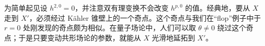 为简单起见设 $h^{2,0}=0$，并注意双有理变换不会改变 $h^{p,0}$ 的值。经典地，要从 $X$ 走到 $X'$，必须经过 Kähler 锥壁上的一个奇点。这个奇点与我们在“flop”例子中于 $r=0$ 处刚发现的奇点颇为相似。在量子场论中，人们可以取 $\theta\ne0$ 绕过这个奇点；于是只要变动共形场论的参数，就能从 $X$ 光滑地延拓到 $X'$。

